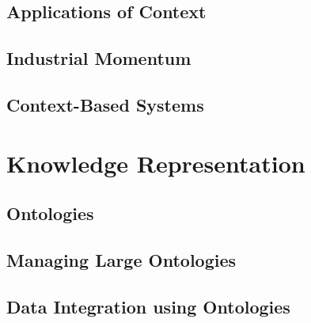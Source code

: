 \subsection{Applications of Context}

\subsection{Industrial Momentum}

\subsection{Context-Based Systems}

\section{Knowledge Representation}

\subsection{Ontologies}

\subsection{Managing Large Ontologies}

\subsection{Data Integration using Ontologies}

